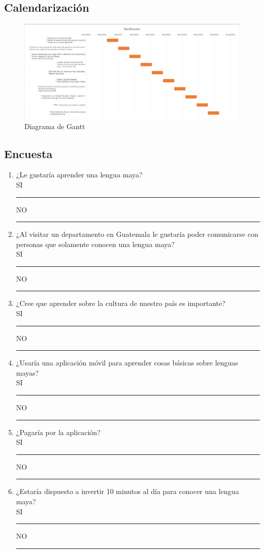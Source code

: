 \documentclass[a4paper,openright,11pt]{article}
\begin{document}
\subsection{Calendarización}
\begin{figure}[h]
  \centering
    \includegraphics[width=1.0\textwidth]{Gantt}
  \caption{Diagrama de Gantt}
  \label{fig:gantt}
\end{figure}

\subsection{Encuesta}
\begin{enumerate}
	\item ¿Le gustaría aprender una lengua maya?\\
	SI \rule{10mm}{0.1mm}  \hspace{5cm} NO \rule{10mm}{0.1mm}
	\item ¿Al visitar un departamento en Guatemala le gustaría poder comunicarse con personas que solamente conocen una lengua maya?	\\
	SI \rule{10mm}{0.1mm}  \hspace{5cm} NO \rule{10mm}{0.1mm}
	\item ¿Cree que aprender sobre la cultura de nuestro país es importante?\\
	SI \rule{10mm}{0.1mm}  \hspace{5cm} NO \rule{10mm}{0.1mm}
	\item ¿Usaría una aplicación móvil para aprender cosas básicas sobre lenguas mayas?\\
	SI \rule{10mm}{0.1mm}  \hspace{5cm} NO \rule{10mm}{0.1mm}
	\item ¿Pagaría por la aplicación?\\
	SI \rule{10mm}{0.1mm}  \hspace{5cm} NO \rule{10mm}{0.1mm}
	\item ¿Estaría dispuesto a invertir 10 minutos al día para conocer una lengua maya?\\
	SI \rule{10mm}{0.1mm}  \hspace{5cm} NO \rule{10mm}{0.1mm}
\end{enumerate}
\newpage
\end{document}
